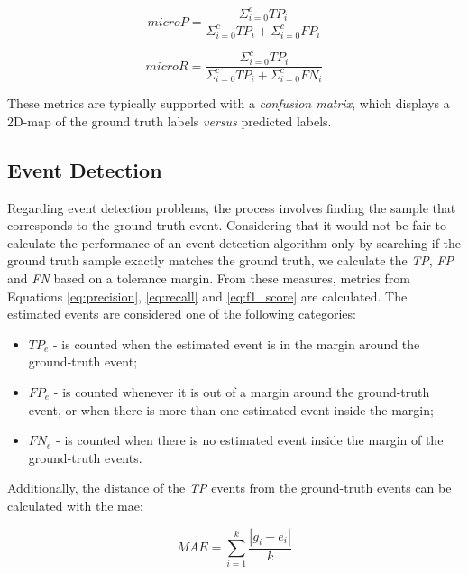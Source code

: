 \begin{equation}
microP = \frac{\Sigma_{i=0}^c TP_i}{\Sigma_{i=0}^c TP_i + \Sigma_{i=0}^c FP_i}
\end{equation}

\begin{equation}
microR = \frac{\Sigma_{i=0}^c TP_i}{\Sigma_{i=0}^c TP_i + \Sigma_{i=0}^c FN_i}
\end{equation}

These metrics are typically supported with a \textit{confusion matrix}, which displays a 2D-map of the ground truth labels \textit{versus} predicted labels.

\subsection{Event Detection}
\label{subsec:event_metrics}

Regarding event detection problems, the process involves finding the sample that corresponds to the ground truth event. Considering that it would not be fair to calculate the performance of an event detection algorithm only by searching if the ground truth sample exactly matches the ground truth, we calculate the \textit{TP}, \textit{FP} and \textit{FN} based on a tolerance margin. From these measures, metrics from Equations \ref{eq:precision}, \ref{eq:recall} and \ref{eq:f1_score} are calculated. The estimated events are considered one of the following categories:

\begin{itemize}
    \item $TP_e$ - is counted when the estimated event is in the margin around the ground-truth event;
    
    \item $FP_e$ - is counted whenever it is out of a margin around the ground-truth event, or when there is more than one estimated event inside the margin;
    
    \item $FN_e$ - is counted when there is no estimated event inside the margin of the ground-truth events.
    
\end{itemize}

Additionally, the distance of the \textit{TP} events from the ground-truth events can be calculated with the \gls{mae}:

\begin{equation}
    MAE = \sum^{k}_{i=1} \frac{|g_{i} - e_{i}|}{k}
\end{equation}

